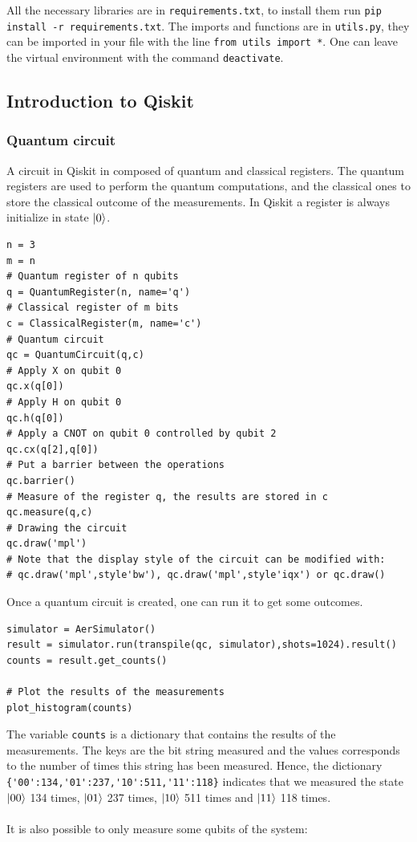 \documentclass{article}
\begin{document}
All the necessary libraries are in \verb|requirements.txt|, to install them run \verb|pip install -r requirements.txt|. The imports and functions are in \verb|utils.py|, they can be imported in your file with the line \verb|from utils import *|. One can leave the virtual environment with the command \verb|deactivate|.

\subsection{Introduction to Qiskit}

\subsubsection{Quantum circuit}

A circuit in Qiskit in composed of quantum and classical registers. The quantum registers are used to perform the quantum computations, and the classical ones to store the classical outcome of the measurements. In Qiskit a register is always initialize in state $\ket{0}$.

\begin{verbatim}
n = 3
m = n
# Quantum register of n qubits
q = QuantumRegister(n, name='q')
# Classical register of m bits
c = ClassicalRegister(m, name='c')
# Quantum circuit
qc = QuantumCircuit(q,c)
# Apply X on qubit 0
qc.x(q[0])
# Apply H on qubit 0
qc.h(q[0])
# Apply a CNOT on qubit 0 controlled by qubit 2
qc.cx(q[2],q[0])
# Put a barrier between the operations
qc.barrier()
# Measure of the register q, the results are stored in c
qc.measure(q,c)
# Drawing the circuit
qc.draw('mpl')
# Note that the display style of the circuit can be modified with:
# qc.draw('mpl',style'bw'), qc.draw('mpl',style'iqx') or qc.draw()
\end{verbatim}
Once a quantum circuit is created, one can run it to get some outcomes.

\begin{verbatim}
simulator = AerSimulator()
result = simulator.run(transpile(qc, simulator),shots=1024).result()
counts = result.get_counts()

# Plot the results of the measurements
plot_histogram(counts)
\end{verbatim}
The variable \verb|counts| is a dictionary that contains the results of the measurements. The keys are the bit string measured and the values corresponds to the number of times this string has been measured. Hence, the dictionary \verb|{'00':134,'01':237,'10':511,'11':118}| indicates that we measured the state $\ket{00}$ 134 times, $\ket{01}$ 237 times, $\ket{10}$ 511 times and $\ket{11}$ 118 times. \\\\ It is also possible to only measure some qubits of the system:
\end{document}
